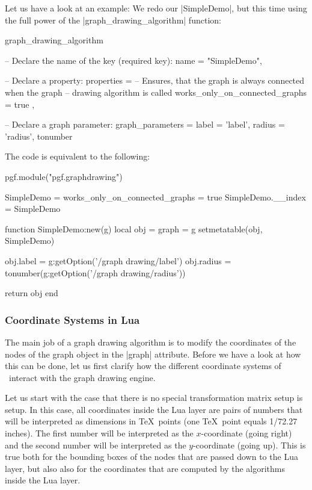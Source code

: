 Let us have a look at an example: We redo our |SimpleDemo|, but this
time using the full power of the |graph_drawing_algorithm| function:

\begin{codeexample}
graph_drawing_algorithm {
  
  -- Declare the name of the key (required key):
  name = "SimpleDemo",

  -- Declare a property:
  properties = {
    -- Ensures, that the graph is always connected when the graph
    -- drawing algorithm is called
    works_only_on_connected_graphs = true
  },

  -- Declare a graph parameter:
  graph_parameters = {
    label  = 'label',
    radius = {'radius', tonumber}
  }
}
\end{codeexample}

The code is equivalent to the following:
\begin{codeexample}
pgf.module("pgf.graphdrawing")

SimpleDemo = { works_only_on_connected_graphs = true }
SimpleDemo.__index = SimpleDemo

function SimpleDemo:new(g)
  local obj = { graph = g }
  setmetatable(obj, SimpleDemo)
  
  obj.label  = g:getOption('/graph drawing/label')
  obj.radius = tonumber(g:getOption('/graph drawing/radius'))
  
  return obj  
end  
\end{codeexample}



\subsubsection{Coordinate Systems in Lua}

\label{section-gd-lua-coordinates}

The main job of a graph drawing algorithm is to modify the
coordinates of the nodes of the graph object in the |graph|
attribute. Before we have a look at how this can be done, let us 
first clarify how the different coordinate systems of \pgfname\
interact with the graph drawing engine.

Let us start with the case that there is no special transformation
matrix setup is setup. In this case, all coordinates inside the Lua
layer are pairs of numbers that will be interpreted as dimensions in
\TeX\ points (one \TeX\ point equals 1/72.27 inches). The first number
will be interpreted as the $x$-coordinate (going right) and the second
number will be interpreted as the $y$-coordinate (going up). This is
true both for the bounding boxes of the nodes that are passed down to
the Lua layer, but also also for the coordinates that are computed by
the algorithms inside the Lua layer.

